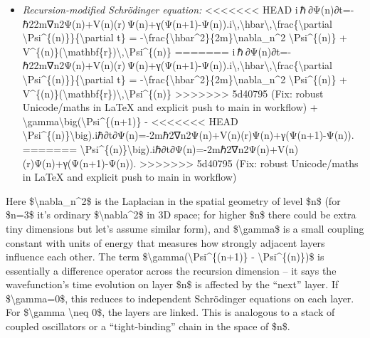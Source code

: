 \documentclass[]{article}
\begin{document}
\begin{itemize}
\item
  \emph{Recursion-modified Schrödinger equation:}
<<<<<<< HEAD
  i ℏ ∂Ψ(n)∂t=-ℏ22m∇n2Ψ(n)+V(n)(r) Ψ(n)+γ(Ψ(n+1)-Ψ(n)).i\textbackslash,\textbackslash hbar\textbackslash,\textbackslash frac\{\textbackslash partial
  \textbackslash Psi\^{}\{(n)\}\}\{\textbackslash partial t\} =
  -\textbackslash frac\{\textbackslash hbar\^{}2\}\{2m\}\textbackslash nabla\_n\^{}2
  \textbackslash Psi\^{}\{(n)\} +
  V\^{}\{(n)\}(\textbackslash mathbf\{r\})\textbackslash,\textbackslash Psi\^{}\{(n)\}
=======
  i ℏ ∂Ψ(n)∂t=-ℏ22m∇n2Ψ(n)+V(n)(r) Ψ(n)+γ(Ψ(n+1)-Ψ(n)).i\textbackslash{},\textbackslash{}hbar\textbackslash{},\textbackslash{}frac\{\textbackslash{}partial
  \textbackslash{}Psi\^{}\{(n)\}\}\{\textbackslash{}partial t\} =
  -\textbackslash{}frac\{\textbackslash{}hbar\^{}2\}\{2m\}\textbackslash{}nabla\_n\^{}2
  \textbackslash{}Psi\^{}\{(n)\} +
  V\^{}\{(n)\}(\textbackslash{}mathbf\{r\})\textbackslash{},\textbackslash{}Psi\^{}\{(n)\}
>>>>>>> 5d40795 (Fix: robust Unicode/maths in LaTeX and explicit push to main in workflow)
  +
  \textbackslash{}gamma\textbackslash{}big(\textbackslash{}Psi\^{}\{(n+1)\}
  -
<<<<<<< HEAD
  \textbackslash Psi\^{}\{(n)\}\textbackslash big).iℏ∂t∂Ψ(n)\hspace{0pt}=-2mℏ2\hspace{0pt}∇n2\hspace{0pt}Ψ(n)+V(n)(r)Ψ(n)+γ(Ψ(n+1)-Ψ(n)).
=======
  \textbackslash{}Psi\^{}\{(n)\}\textbackslash{}big).iℏ∂t∂Ψ(n)​=-2mℏ2​∇n2​Ψ(n)+V(n)(r)Ψ(n)+γ(Ψ(n+1)-Ψ(n)).
>>>>>>> 5d40795 (Fix: robust Unicode/maths in LaTeX and explicit push to main in workflow)
\end{itemize}

Here \$\textbackslash{}nabla\_n\^{}2\$ is the Laplacian in the spatial
geometry of level \$n\$ (for \$n=3\$ it's ordinary
\$\textbackslash{}nabla\^{}2\$ in 3D space; for higher \$n\$ there could
be extra tiny dimensions but let's assume similar form), and
\$\textbackslash{}gamma\$ is a small coupling constant with units of
energy that measures how strongly adjacent layers influence each other​.
The term \$\textbackslash{}gamma(\textbackslash{}Psi\^{}\{(n+1)\} -
\textbackslash{}Psi\^{}\{(n)\})\$ is essentially a difference operator
across the recursion dimension -- it says the wavefunction's time
evolution on layer \$n\$ is affected by the ``next'' layer. If
\$\textbackslash{}gamma=0\$, this reduces to independent Schrödinger
equations on each layer. For \$\textbackslash{}gamma \textbackslash{}neq
0\$, the layers are linked. This is analogous to a stack of coupled
oscillators or a ``tight-binding'' chain in the space of \$n\$​.
\end{document}
